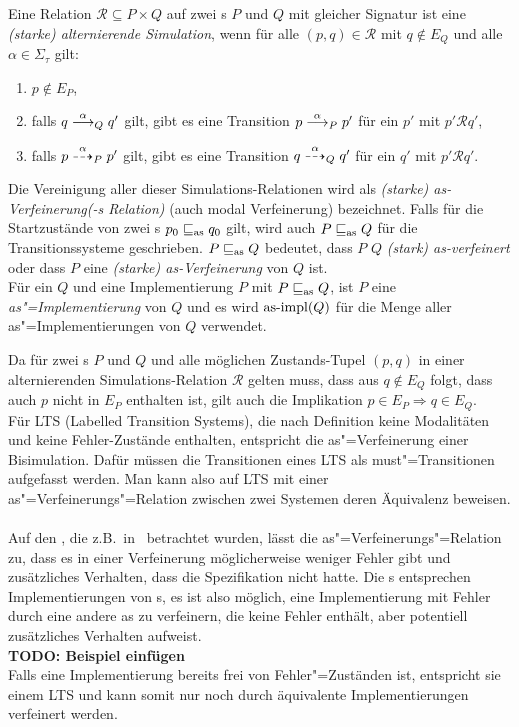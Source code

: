 \begin{Def}
  \label{SimDef}
  Eine Relation $\mathcal{R}\subseteq P \times Q$ auf zwei \MEIO{}s $P$ und $Q$
  mit gleicher Signatur ist eine \emph{(starke) alternierende Simulation}, wenn
  für alle $(p,q)\in \mathcal{R}$ mit $q\notin E_Q$ und alle $\alpha\in\Sigma
  _\tau$ gilt:
  \begin{enumerate}
    \item $p\notin E_P$,
    \item falls $q\must[\alpha]_Q q'$ gilt, gibt es eine Transition
      $p\must[\alpha]_P p'$ für ein $p'$ mit $p'\mathcal{R}q'$,
    \item falls $p\may[\alpha]_P p'$ gilt, gibt es eine Transition
      $q\may[\alpha]_Q q'$ für ein $q'$ mit $p'\mathcal{R}q'$.
  \end{enumerate}
  Die Vereinigung \asRel{} aller dieser Simulations-Relationen wird als
  \emph{(starke) as-Verfeinerung(-s Relation)} (auch modal Verfeinerung)
  bezeichnet. Falls für die Startzustände von zwei \MEIO{}s $p_0\sqsubseteq _{\mathrm{as}} q_0$
  gilt, wird auch $P\sqsubseteq _{\mathrm{as}} Q$ für die Transitionssysteme geschrieben. $P\sqsubseteq _{\mathrm{as}}
  Q$ bedeutet, dass $P$ $Q$ \emph{(stark) as-verfeinert} oder dass $P$ eine
  \emph{(starke) as-Verfeinerung} von $Q$ ist.\\
  Für ein \MEIO{} $Q$ und eine Implementierung $P$ mit $P\sqsubseteq _{\mathrm{as}}{}Q$, ist
  $P$ eine \emph{as"=Implementierung} von $Q$ und es wird $\mathrm{as}\text{-}\mathrm{impl} (Q)$ für die
  Menge aller as"=Implementierungen von $Q$ verwendet.
\end{Def}

Da für zwei \MEIO{}s $P$ und $Q$ und alle möglichen Zustands-Tupel $(p,q)$ in
einer alternierenden Simulations-Relation $\mathcal{R}$ gelten muss, dass aus
$q\notin E_Q$ folgt, dass auch $p$ nicht in $E_P$ enthalten ist, gilt auch die
Implikation $p\in E_P\Rightarrow q\in E_Q$.\\
Für LTS (Labelled Transition Systems), die nach Definition keine Modalitäten
und keine Fehler-Zustände enthalten, entspricht die as"=Verfeinerung einer
Bisimulation. Dafür müssen die Transitionen eines LTS als must"=Transitionen
aufgefasst werden. Man kann also auf LTS mit einer as"=Verfeinerungs"=Relation
zwischen zwei Systemen deren Äquivalenz beweisen.\\ \\
Auf den \EIO{}, die z.B.\ in~\cite{Schinko2016BA} betrachtet wurden, lässt die
as"=Verfeinerungs"=Relation zu, dass es in einer Verfeinerung möglicherweise
weniger Fehler gibt und zusätzliches Verhalten, dass die Spezifikation nicht
hatte. Die \EIO{}s entsprechen Implementierungen von \MEIO{}s, es ist also
möglich, eine Implementierung mit Fehler durch eine andere as zu verfeinern,
die keine Fehler enthält, aber potentiell zusätzliches Verhalten aufweist.
\\ \textbf{TODO: Beispiel einfügen} \\
Falls eine Implementierung bereits frei von Fehler"=Zuständen ist, entspricht
sie einem LTS und kann somit nur noch durch äquivalente Implementierungen \glqq
verfeinert\grqq{} werden.

